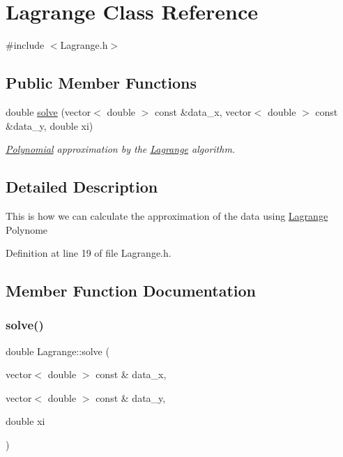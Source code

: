 \hypertarget{class_lagrange}{}\section{Lagrange Class Reference}
\label{class_lagrange}


{\ttfamily \#include $<$Lagrange.\+h$>$}

\subsection*{Public Member Functions}
\begin{DoxyCompactItemize}
\item 
double \mbox{\hyperlink{class_lagrange_a9040a01112a83bbefb0f1bef1d7983bb}{solve}} (vector$<$ double $>$ const \&data\+\_\+x, vector$<$ double $>$ const \&data\+\_\+y, double xi)
\begin{DoxyCompactList}\small\item\em \mbox{\hyperlink{class_polynomial}{Polynomial}} approximation by the \mbox{\hyperlink{class_lagrange}{Lagrange}} algorithm. \end{DoxyCompactList}\end{DoxyCompactItemize}


\subsection{Detailed Description}
This is how we can calculate the approximation of the data using \mbox{\hyperlink{class_lagrange}{Lagrange}} Polynome 

Definition at line 19 of file Lagrange.\+h.



\subsection{Member Function Documentation}
\mbox{\label{class_lagrange_a9040a01112a83bbefb0f1bef1d7983bb}} 
\subsubsection{\texorpdfstring{solve()}{solve()}}
{\footnotesize\ttfamily double Lagrange\+::solve (\begin{DoxyParamCaption}\item[{vector$<$ double $>$ const \&}]{data\+\_\+x,  }\item[{vector$<$ double $>$ const \&}]{data\+\_\+y,  }\item[{double}]{xi }\end{DoxyParamCaption})}



